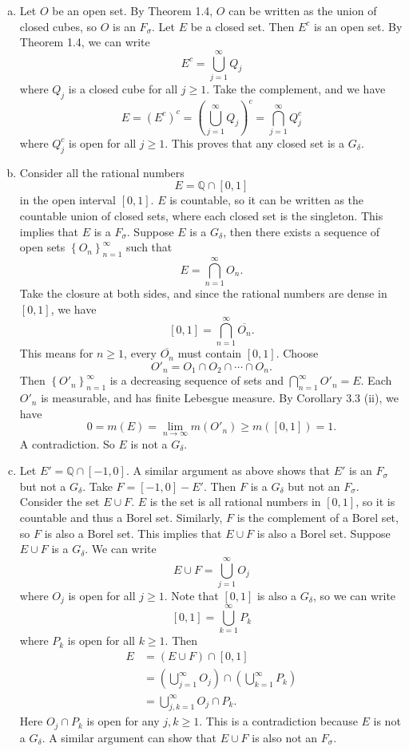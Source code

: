 \documentclass[letterpaper, 12pt]{article}
\begin{document}
\begin{solution}
\begin{enumerate}[(a)]
  \item Let \(O\) be an open set. By Theorem 1.4, \(O\) can be written as the union of closed cubes, so \(O\) is an \(F_\sigma\). Let \(E\) be a closed set. Then \(E^c\) is an open set. By Theorem 1.4, we can write 
  \[E^c=\bigcup_{j=1}^\infty Q_j\]
  where \(Q_j\) is a closed cube for all \(j\geq 1\). Take the complement, and we have 
  \[E=(E^c)^c=(\bigcup_{j=1}^\infty Q_j)^c=\bigcap_{j=1}^\infty Q_j^c\]
  where \(Q_j^c\) is open for all \(j\geq 1\). This proves that any closed set is a \(G_\delta\).
  \item Consider all the rational numbers 
  \[E=\mathbb{Q}\cap [0,1]\]
  in the open interval \([0,1]\). \(E\) is countable, so it can be written as the countable union of closed sets, where each closed set is the singleton. This implies that \(E\) is a \(F_\sigma\). Suppose \(E\) is a \(G_\delta\), then there exists a sequence of open sets \(\left\{ O_n \right\}_{n=1}^\infty\) such that
  \[E=\bigcap_{n=1}^\infty O_n.\]
  Take the closure at both sides, and since the rational numbers are dense in \([0,1]\), we have 
  \[[0,1]=\bigcap_{n=1}^\infty \overline{O_n}.\] 
  This means for \(n\geq 1\), every \(\overline{O_n}\) must contain \([0,1]\). Choose 
  \[O'_n=O_1\cap O_2\cap\cdots \cap O_n.\]
  Then \(\left\{ O'_n \right\}_{n=1}^\infty\) is a decreasing sequence of sets and \(\bigcap_{n=1}^\infty O'_n=E\). Each \(O'_n\) is measurable, and has finite Lebesgue measure. By Corollary 3.3 (ii), we have 
  \[0=m(E)=\lim_{n\to \infty} m(O'_n)\geq m([0,1])=1.\]
  A contradiction. So \(E\) is not a \(G_\delta\).
  \item Let \(E'=\mathbb{Q}\cap [-1,0]\). A similar argument as above shows that \(E'\) is an \(F_\sigma\) but not a \(G_\delta\). Take \(F=[-1,0]-E'\). Then \(F\) is a \(G_\delta\) but not an \(F_\sigma\). Consider the set \(E\cup F\). \(E\) is the set is all rational numbers in \([0,1]\), so it is countable and thus a Borel set. Similarly, \(F\) is the complement of a Borel set, so \(F\) is also a Borel set. This implies that \(E\cup F\) is also a Borel set. Suppose \(E\cup F\) is a \(G_\delta\). We can write 
  \[E\cup F=\bigcup_{j=1}^\infty O_j\]
  where \(O_j\) is open for all \(j\geq 1\). Note that \([0,1]\) is also a \(G_\delta\), so we can write 
  \[[0,1]=\bigcup_{k=1}^\infty P_k\] 
  where \(P_k\) is open for all \(k\geq 1\). Then 
  \begin{align*}
       E&=(E\cup F)\cap [0,1]\\ 
        &=(\bigcup_{j=1}^\infty O_j)\cap (\bigcup_{k=1}^\infty P_k)\\ 
        &=\bigcup_{j,k=1}^\infty O_j\cap P_k.
  \end{align*}
  Here \(O_j\cap P_k\) is open for any \(j,k\geq 1\). This is a contradiction because \(E\) is not a \(G_\delta\). A similar argument can show that \(E\cup F\) is also not an \(F_\sigma\).
\end{enumerate}
\end{solution}
\end{document}

